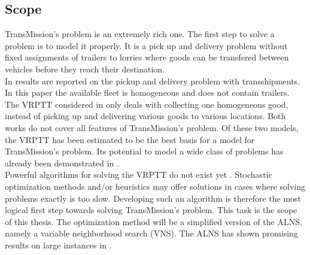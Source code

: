 \subsection{Scope}

TransMission's problem is an extremely rich one.
The first step to solve a problem is to model it properly.
It is a pick up and delivery problem without fixed assignments of trailers to lorries where goods can be transfered between vehicles before they reach their destination.
\\


In \cite{masson2013adaptive} results are reported on the pickup and delivery problem with transshipments.
In this paper the available fleet is homogeneous and does not contain trailers.
The VRPTT considered in \cite{drexl2007some} only deals with collecting one homogeneous good, instead of picking up and delivering various goods to various locations.
Both works do not cover all features of TransMission's problem.
Of these two models, the VRPTT has been estimated to be the best basis for a model for TransMission's problem.
Its potential to model a wide class of problems has already been demonstrated in \cite{drexl2013applications}.\\



Powerful algorithms for solving the VRPTT do not exist yet \cite{drexl2014bandc}.
Stochastic optimization methods and/or heuristics may offer solutions in cases where solving problems exactly is too slow.
Developing such an algorithm is therefore the most logical first step towards solving TransMission's problem. This task is the scope of this thesis. The optimization method will be a simplified version of the ALNS, namely a variable neighborhood search (VNS). The ALNS  has shown promising results on large instances in \cite{masson2013adaptive}.\\

